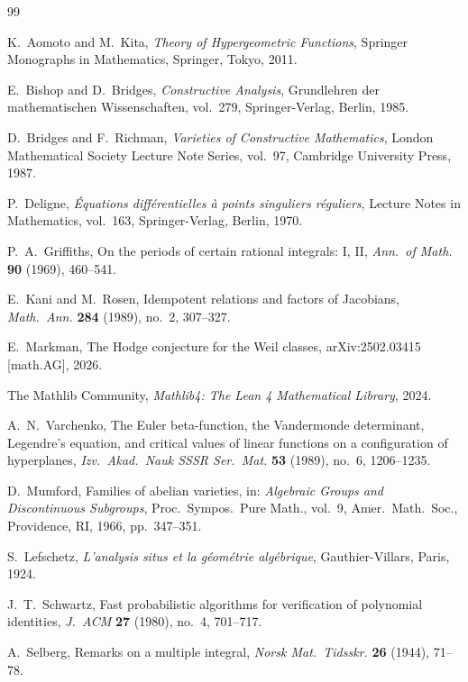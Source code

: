 \documentclass[11pt]{article}
\theoremstyle{plain}
\theoremstyle{definition}
\theoremstyle{remark}
\begin{document}
\begin{thebibliography}{99}

K.~Aomoto and M.~Kita,
\emph{Theory of Hypergeometric Functions},
Springer Monographs in Mathematics, Springer, Tokyo, 2011.

E.~Bishop and D.~Bridges,
\emph{Constructive Analysis},
Grundlehren der mathematischen Wissenschaften, vol.~279,
Springer-Verlag, Berlin, 1985.

D.~Bridges and F.~Richman,
\emph{Varieties of Constructive Mathematics},
London Mathematical Society Lecture Note Series, vol.~97,
Cambridge University Press, 1987.

P.~Deligne,
\emph{\'{E}quations diff\'{e}rentielles \`{a} points singuliers r\'{e}guliers},
Lecture Notes in Mathematics, vol.~163, Springer-Verlag, Berlin, 1970.

P.~A.~Griffiths,
On the periods of certain rational integrals: I, II,
\emph{Ann.\ of Math.} \textbf{90} (1969), 460--541.

E.~Kani and M.~Rosen,
Idempotent relations and factors of Jacobians,
\emph{Math.\ Ann.} \textbf{284} (1989), no.~2, 307--327.

E.~Markman,
The Hodge conjecture for the Weil classes,
arXiv:2502.03415 [math.AG], 2026.

The Mathlib Community,
\emph{Mathlib4: The Lean 4 Mathematical Library}, 2024.

A.~N.~Varchenko,
The Euler beta-function, the Vandermonde determinant, Legendre's equation,
and critical values of linear functions on a configuration of hyperplanes,
\emph{Izv.\ Akad.\ Nauk SSSR Ser.\ Mat.} \textbf{53} (1989), no.~6, 1206--1235.

D.~Mumford,
Families of abelian varieties,
in: \emph{Algebraic Groups and Discontinuous Subgroups},
Proc.\ Sympos.\ Pure Math., vol.~9,
Amer.\ Math.\ Soc., Providence, RI, 1966, pp.~347--351.

S.~Lefschetz,
\emph{L'analysis situs et la g\'{e}om\'{e}trie alg\'{e}brique},
Gauthier-Villars, Paris, 1924.

J.~T.~Schwartz,
Fast probabilistic algorithms for verification of polynomial identities,
\emph{J.~ACM} \textbf{27} (1980), no.~4, 701--717.

A.~Selberg,
Remarks on a multiple integral,
\emph{Norsk Mat.\ Tidsskr.} \textbf{26} (1944), 71--78.


\end{thebibliography}
\end{document}

